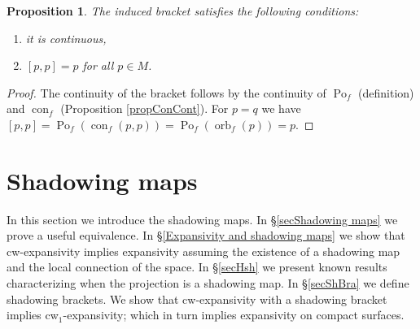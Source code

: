 \documentclass[12pt]{amsart}
\theoremstyle{plain}
\newtheorem{prop}[thm]{Proposition}
\theoremstyle{definition}
\theoremstyle{remark}
\DeclareMathOperator{\orb}{orb}
\DeclareMathOperator{\con}{con}
\DeclareMathOperator{\pom}{Po}
\begin{document}
\begin{prop}
	The induced bracket satisfies the following conditions:
	\begin{enumerate}
		\item it is continuous,
		\item $[p,p]=p$ for all $p\in M$.
	\end{enumerate}
\end{prop}
\begin{proof}
	The continuity of the bracket follows by the continuity of $\pom_f$ (definition) and $\con_f$ (Proposition \ref{propConCont}).
	For $p=q$ we have
	$
	[p,p]=\pom_f(\con_f(p,p))=\pom_f(\orb_f(p))=p.
	$
\end{proof}



\section{Shadowing maps}
\label{secShm}

In this section we introduce the shadowing maps.
In \S\ref{secShadowing maps} we prove a useful equivalence.
In \S\ref{Expansivity and shadowing maps} we show that cw-expansivity implies expansivity assuming the existence of a shadowing map and the local connection of the space.
In \S\ref{secHsh} we present known results characterizing when the projection is a shadowing map.
In \S\ref{secShBra} we define shadowing brackets. We show
that cw-expansivity with a shadowing bracket implies cw$_1$-expansivity; which in turn implies expansivity on compact surfaces.
\end{document}
